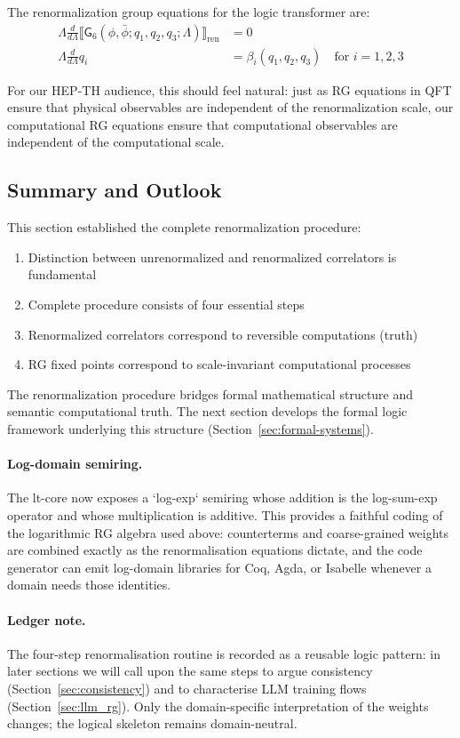 \begin{definition}
\label{def:rg-equations-renorm}
The renormalization group equations for the logic transformer are:
\begin{align}
\Lambda \frac{d}{d\Lambda} \llbracket \mathsf{G}_6(\phi,\bar{\phi};q_1,q_2,q_3;\Lambda)\rrbracket_{\text{ren}} &= 0\\
\Lambda \frac{d}{d\Lambda} q_i &= \beta_i(q_1,q_2,q_3) \quad \text{for } i = 1,2,3
\end{align}
\end{definition}

For our HEP-TH audience, this should feel natural: just as RG equations in QFT ensure that physical observables are independent of the renormalization scale, our computational RG equations ensure that computational observables are independent of the computational scale.

\subsection{Summary and Outlook}

This section established the complete renormalization procedure:

\begin{enumerate}
\item Distinction between unrenormalized and renormalized correlators is fundamental
\item Complete procedure consists of four essential steps
\item Renormalized correlators correspond to reversible computations (truth)
\item RG fixed points correspond to scale-invariant computational processes
\end{enumerate}

The renormalization procedure bridges formal mathematical structure and semantic computational truth. The next section develops the formal logic framework underlying this structure (Section~\ref{sec:formal-systems}).

\paragraph{Log-domain semiring.} The lt-core now exposes a `log-exp` semiring whose addition is the log-sum-exp operator and whose multiplication is additive. This provides a faithful coding of the logarithmic RG algebra used above: counterterms and coarse-grained weights are combined exactly as the renormalisation equations dictate, and the code generator can emit log-domain libraries for Coq, Agda, or Isabelle whenever a domain needs those identities.

\paragraph{Ledger note.} The four-step renormalisation routine is recorded as a reusable logic pattern: in later sections we will call upon the same steps to argue consistency (Section~\ref{sec:consistency}) and to characterise LLM training flows (Section~\ref{sec:llm_rg}). Only the domain-specific interpretation of the weights changes; the logical skeleton remains domain-neutral.
